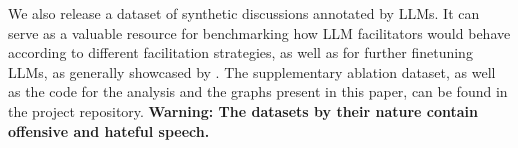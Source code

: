 %

We also release \vmd\datasetlink a dataset of synthetic discussions annotated by \acp{LLM}. It can serve as a valuable resource for benchmarking how \ac{LLM} facilitators would behave according to different facilitation strategies, as well as for further finetuning \acp{LLM}, as generally showcased by \citet{ulmer2024}. The supplementary ablation dataset, as well as the code for the analysis and the graphs present in this paper, can be found in the project repository\analysislink. \textbf{Warning: The datasets by their nature contain offensive and hateful speech.}